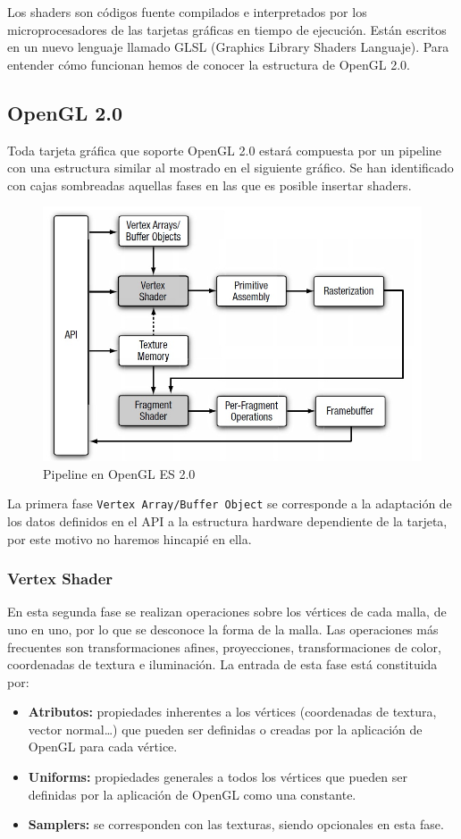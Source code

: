  Los shaders son códigos fuente compilados e interpretados por los microprocesadores de las tarjetas gráficas en tiempo de ejecución. Están escritos en un nuevo lenguaje llamado GLSL (Graphics Library Shaders Languaje). Para entender cómo funcionan hemos de conocer la estructura de OpenGL 2.0.

\subsection{OpenGL 2.0}

Toda tarjeta gráfica que soporte OpenGL 2.0 estará compuesta por un pipeline con una estructura similar al mostrado en el siguiente gráfico. Se han identificado con cajas sombreadas aquellas fases en las que es posible insertar shaders.
\newline

\begin{figure}[h!]
\centering
\includegraphics[width=11.5cm]{img/OpenGL_Pipeline2.jpg}
\caption{Pipeline en OpenGL ES 2.0}
\end{figure}

La primera fase \texttt{Vertex Array/Buffer Object} se corresponde a la adaptación de los datos definidos en el API a la estructura hardware dependiente de la tarjeta, por este motivo no haremos hincapié en ella.

\subsubsection{Vertex Shader}

En esta segunda fase se realizan operaciones sobre los vértices de cada malla, de uno en uno, por lo que se desconoce la forma de la malla. Las operaciones más frecuentes son transformaciones afines, proyecciones, transformaciones de color, coordenadas de textura e iluminación. La entrada de esta fase está constituida por:
\begin{itemize}
\item \textbf{Atributos:} propiedades inherentes a los vértices (coordenadas de textura, vector normal\ldots) que pueden ser definidas o creadas por la aplicación de OpenGL para cada vértice. 
\item \textbf{Uniforms:} propiedades generales a todos los vértices que pueden ser definidas por la aplicación de OpenGL como una constante.
\item \textbf{Samplers:} se corresponden con las texturas, siendo opcionales en esta fase.
\end{itemize}

